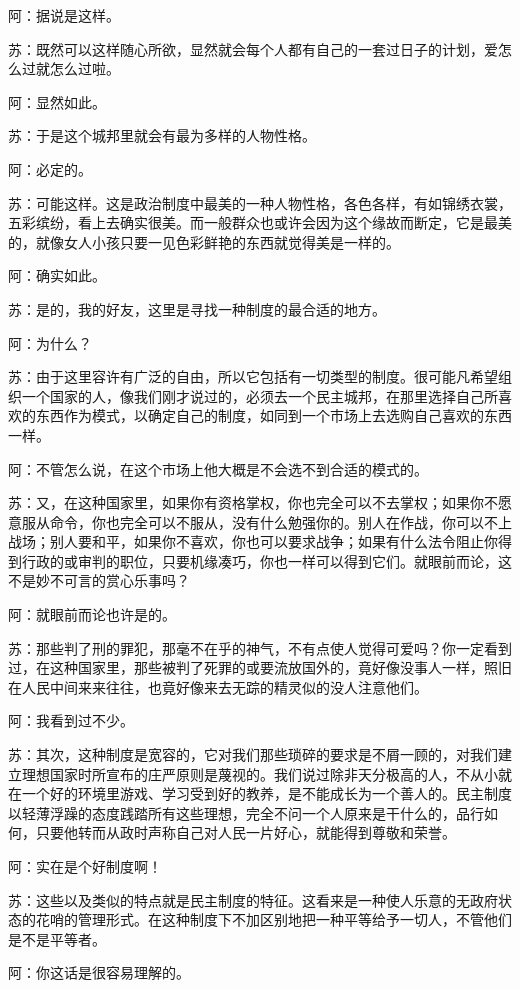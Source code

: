 \documentclass[12pt,oneside]{book}
\begin{document}
阿：据说是这样。

苏：既然可以这样随心所欲，显然就会每个人都有自己的一套过日子的计划，爱怎么过就怎么过啦。

阿：显然如此。

苏：于是这个城邦里就会有最为多样的人物性格。

阿：必定的。

苏：可能这样。这是政治制度中最美的一种人物性格，各色各样，有如锦绣衣裳，五彩缤纷，看上去确实很美。而一般群众也或许会因为这个缘故而断定，它是最美的，就像女人小孩只要一见色彩鲜艳的东西就觉得美是一样的。

阿：确实如此。

苏：是的，我的好友，这里是寻找一种制度的最合适的地方。

阿：为什么？

苏：由于这里容许有广泛的自由，所以它包括有一切类型的制度。很可能凡希望组织一个国家的人，像我们刚才说过的，必须去一个民主城邦，在那里选择自己所喜欢的东西作为模式，以确定自己的制度，如同到一个市场上去选购自己喜欢的东西一样。

阿：不管怎么说，在这个市场上他大概是不会选不到合适的模式的。

苏：又，在这种国家里，如果你有资格掌权，你也完全可以不去掌权；如果你不愿意服从命令，你也完全可以不服从，没有什么勉强你的。别人在作战，你可以不上战场；别人要和平，如果你不喜欢，你也可以要求战争；如果有什么法令阻止你得到行政的或审判的职位，只要机缘凑巧，你也一样可以得到它们。就眼前而论，这不是妙不可言的赏心乐事吗？

阿：就眼前而论也许是的。

苏：那些判了刑的罪犯，那毫不在乎的神气，不有点使人觉得可爱吗？你一定看到过，在这种国家里，那些被判了死罪的或要流放国外的，竟好像没事人一样，照旧在人民中间来来往往，也竟好像来去无踪的精灵似的没人注意他们。

阿：我看到过不少。

苏：其次，这种制度是宽容的，它对我们那些琐碎的要求是不屑一顾的，对我们建立理想国家时所宣布的庄严原则是蔑视的。我们说过除非天分极高的人，不从小就在一个好的环境里游戏、学习受到好的教养，是不能成长为一个善人的。民主制度以轻薄浮躁的态度践踏所有这些理想，完全不问一个人原来是干什么的，品行如何，只要他转而从政时声称自己对人民一片好心，就能得到尊敬和荣誉。

阿：实在是个好制度啊！

苏：这些以及类似的特点就是民主制度的特征。这看来是一种使人乐意的无政府状态的花哨的管理形式。在这种制度下不加区别地把一种平等给予一切人，不管他们是不是平等者。

阿：你这话是很容易理解的。
\end{document}
